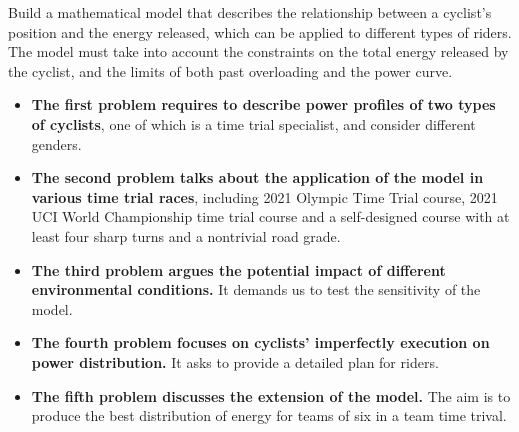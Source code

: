 \par Build a mathematical model that describes the relationship between a cyclist's position and the energy released, which can be applied to different types of riders. The model must take into account the constraints on the total energy released by the cyclist, and the limits of both past overloading and the power curve.
\begin{itemize}
	\item {\bf The first problem requires to describe power profiles of two types of cyclists}, one of which is a time trial specialist, and consider different genders.
	\item {\bf The second problem talks about the application of the model in various time trial races}, including 2021 Olympic Time Trial course, 2021 UCI World Championship time trial course and a self-designed course with at least four sharp turns and a nontrivial road grade.
	\item {\bf The third problem argues the potential impact of different environmental conditions.} It demands us to test the sensitivity of the model.
	\item {\bf The fourth problem focuses on cyclists' imperfectly execution on power distribution.} It asks to provide a detailed plan for riders.
	\item {\bf The fifth problem discusses the extension of the model.} The aim is to produce the best distribution of energy for teams of six in a team time trival.
\end{itemize}
